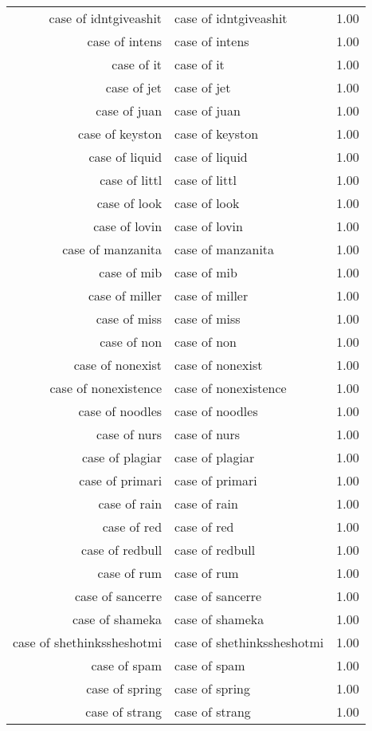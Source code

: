 \begin{table}[ht]
\begin{tabular}{rlr}
  case of idntgiveashit & case of idntgiveashit & 1.00 \\ 
  case of intens & case of intens & 1.00 \\ 
  case of it & case of it & 1.00 \\ 
  case of jet & case of jet & 1.00 \\ 
  case of juan & case of juan & 1.00 \\ 
  case of keyston & case of keyston & 1.00 \\ 
  case of liquid & case of liquid & 1.00 \\ 
  case of littl & case of littl & 1.00 \\ 
  case of look & case of look & 1.00 \\ 
  case of lovin & case of lovin & 1.00 \\ 
  case of manzanita & case of manzanita & 1.00 \\ 
  case of mib & case of mib & 1.00 \\ 
  case of miller & case of miller & 1.00 \\ 
  case of miss & case of miss & 1.00 \\ 
  case of non & case of non & 1.00 \\ 
  case of nonexist & case of nonexist & 1.00 \\ 
  case of nonexistence & case of nonexistence & 1.00 \\ 
  case of noodles & case of noodles & 1.00 \\ 
  case of nurs & case of nurs & 1.00 \\ 
  case of plagiar & case of plagiar & 1.00 \\ 
  case of primari & case of primari & 1.00 \\ 
  case of rain & case of rain & 1.00 \\ 
  case of red & case of red & 1.00 \\ 
  case of redbull & case of redbull & 1.00 \\ 
  case of rum & case of rum & 1.00 \\ 
  case of sancerre & case of sancerre & 1.00 \\ 
  case of shameka & case of shameka & 1.00 \\ 
  case of shethinkssheshotmi & case of shethinkssheshotmi & 1.00 \\ 
  case of spam & case of spam & 1.00 \\ 
  case of spring & case of spring & 1.00 \\ 
  case of strang & case of strang & 1.00 \\ 

\end{tabular}
\end{table}
